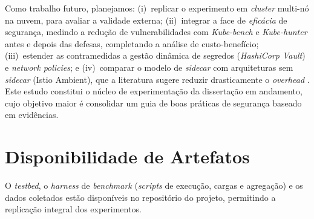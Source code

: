 \documentclass[12pt]{article}
\begin{document}
Como trabalho futuro, planejamos: (i)~replicar o experimento em \textit{cluster} multi-n\'o na nuvem, para avaliar a validade externa; (ii)~integrar a face de \emph{efic\'acia} de seguran\c{c}a, medindo a redu\c{c}\~ao de vulnerabilidades com \textit{Kube-bench} e \textit{Kube-hunter} antes e depois das defesas, completando a an\'alise de custo-benef\'icio; (iii)~estender as contramedidas a gest\~ao din\^amica de segredos (\textit{HashiCorp Vault}) e \textit{network policies}; e (iv)~comparar o modelo de \textit{sidecar} com arquiteturas sem \textit{sidecar} (Istio Ambient), que a literatura sugere reduzir drasticamente o \textit{overhead} \cite{bremlerbarr2024}. Este estudo constitui o n\'ucleo de experimenta\c{c}\~ao da disserta\c{c}\~ao em andamento, cujo objetivo maior \'e consolidar um guia de boas pr\'aticas de seguran\c{c}a baseado em evid\^encias.

\section*{Disponibilidade de Artefatos}

O \textit{testbed}, o \textit{harness} de \textit{benchmark} (\textit{scripts} de execu\c{c}\~ao, cargas e agrega\c{c}\~ao) e os dados coletados est\~ao dispon\'iveis no reposit\'orio do projeto, permitindo a replica\c{c}\~ao integral dos experimentos.



\end{document}
